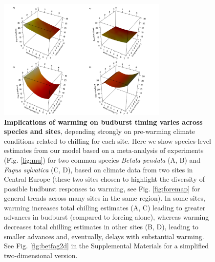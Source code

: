 \documentclass{article}
\begin{document}
\begin{figure}[h!]
\centering
\noindent \includegraphics[width=0.75\textwidth]{..//..//analyses/bb_analysis/figures/forecasting/tempforecastbothspp_1_7_degwarm3D_utah.png}
\caption{\textbf{Implications of warming on budburst timing varies across species and sites}, depending strongly on pre-warming climate conditions related to chilling for each site. Here we show species-level estimates from our model based on a meta-analysis of experiments (Fig. \ref{fig:mu}) for two common species \emph{Betula pendula} (A, B) and \emph{Fagus sylvatica} (C, D), based on climate data from two sites in Central Europe (these two sites chosen to highlight the diversity of possible budburst responses to warming, see Fig. \ref{fig:foremap} for general trends across many sites in the same region). In some sites, warming increases total chilling estimates (A, C) leading to greater advances in budburst (compared to forcing alone), whereas warming decreases total chilling estimates in other sites (B, D), leading to smaller advances and, eventually, delays with substantial warming. See Fig. \ref{fig:betfag2d} in the Supplemental Materials for a simplified two-dimensional version.}
\label{fig:betfag3d}
\end{figure}

\end{document}
